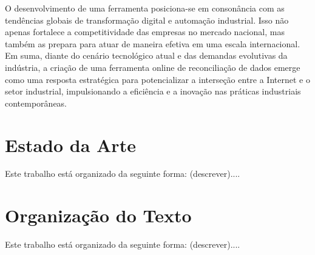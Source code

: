 O desenvolvimento de uma ferramenta posiciona-se em consonância com as tendências globais de transformação digital e automação industrial. Isso não apenas fortalece a competitividade das empresas no mercado nacional, mas também as prepara para atuar de maneira efetiva em uma escala internacional. Em suma, diante do cenário tecnológico atual e das demandas evolutivas da indústria, a criação de uma ferramenta online de reconciliação de dados emerge como uma resposta estratégica para potencializar a interseção entre a Internet e o setor industrial, impulsionando a eficiência e a inovação nas práticas industriais contemporâneas.

\section{Estado da Arte}

Este trabalho está organizado da seguinte forma: (descrever)....

\section{Organização do Texto}

Este trabalho está organizado da seguinte forma: (descrever)....


